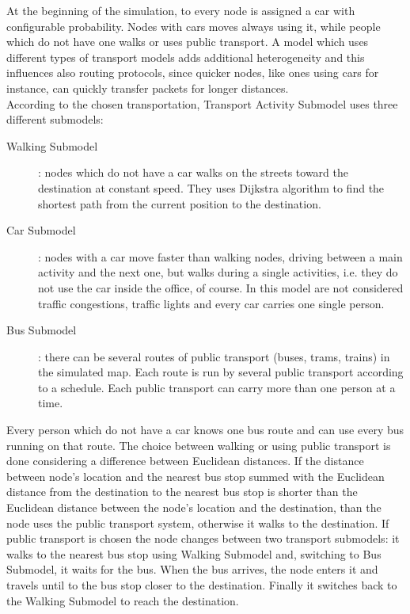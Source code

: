 At the beginning of the simulation, to every node is assigned a car with configurable probability. Nodes with cars moves always using it, while people which do not have one walks or uses public transport. A model which uses different types of transport models adds additional heterogeneity and this influences also routing protocols, since quicker nodes, like ones using cars for instance, can quickly transfer packets for longer distances.
\\

According to the chosen transportation, Transport Activity Submodel uses three different submodels:
\\

\begin{description}
\item [Walking Submodel]: nodes which do not have a car walks on the streets toward the destination at constant speed. They uses Dijkstra algorithm to find the shortest path from the current position to the destination.

\item [Car Submodel]: nodes with a car move faster than walking nodes, driving between a main activity and the next one, but walks during a single activities, i.e. they do not use the car inside the office, of course. In this model are not considered traffic congestions, traffic lights and every car carries one single person.

\item [Bus Submodel]: there can be several routes of public transport (buses, trams, trains) in the simulated map. Each route is run by several public transport according to a schedule. Each public transport can carry more than one person at a time.
\end{description}

Every person which do not have a car knows one bus route and can use every bus running on that route. The choice between walking or using public transport is done considering a difference between Euclidean distances. If the distance between node's location and the nearest bus stop summed with the Euclidean distance from the destination to the nearest bus stop is shorter than the Euclidean distance between the node's location and the destination, than the node uses the public transport system, otherwise it walks to the destination. If public transport is chosen the node changes between two transport submodels: it walks to the nearest bus stop using Walking Submodel and, switching to Bus Submodel, it waits for the bus. When the bus arrives, the node enters it and travels until to the bus stop closer to the destination. Finally it switches back to the Walking Submodel to reach the destination.
 

